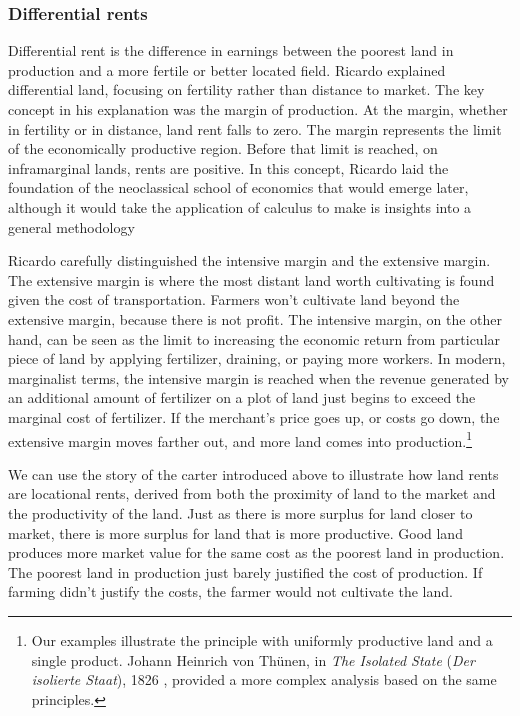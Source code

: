 
\subsubsection{Differential rents}

Differential rent is the difference in earnings between the poorest land in production and a more fertile or better located field. Ricardo explained  differential land, focusing on fertility rather than distance to market. 
The key concept in his explanation was the margin of production. 
At the \gls{margin}, whether in fertility or in distance, land \gls{rent} falls to zero.  The margin represents the limit of the economically productive region.  
Before that limit is reached, on \gls{inframarginal} lands, rents are positive. In  this concept, Ricardo laid the foundation of the neoclassical school of economics that would emerge later, although it would take the application of calculus to make is insights into a general methodology 

Ricardo carefully distinguished the \gls{intensive margin} and the \gls{extensive margin}. The extensive margin is where the most distant land worth cultivating is found given the cost of transportation. Farmers won't cultivate land beyond the extensive margin, because there is not profit. The intensive margin, on the other hand, can be seen as the limit to increasing the economic return from  particular piece of land by applying fertilizer, draining, or paying more workers. In modern, \gls{marginalist} terms, the intensive margin is reached when the revenue generated by an additional amount of fertilizer on a plot of land just begins to exceed the marginal cost of fertilizer. If the merchant's price goes up, or costs go down, the \gls{extensive margin} moves farther out, and more land comes into production.\footnote{Our examples illustrate the principle with uniformly productive land and a single product. Johann Heinrich von Th\"unen, in \textit{The Isolated State} (\textit{Der isolierte Staat}), 1826 \cite{vonthunenIsolirteStaatBeziehung1826}, provided a more complex analysis based on the same principles.}

We can use the story of the carter introduced above to illustrate how land rents are locational rents, derived from both the proximity of land to the market and the productivity of the land. Just as there is more surplus for land closer to market, there is more surplus for land that is more productive. Good land produces more market value for the same cost as the poorest land in production. The poorest land in production just barely justified the cost of production. If farming didn't justify the costs, the farmer would not cultivate the land. 

